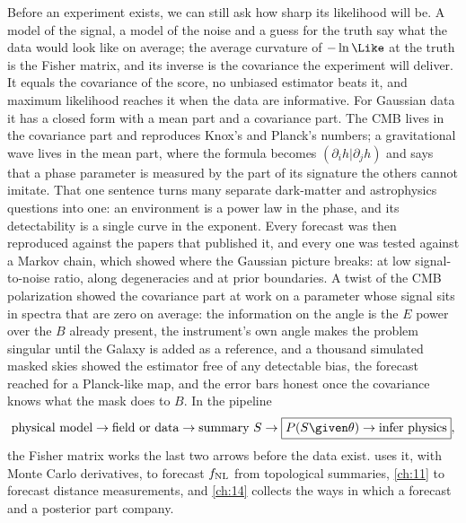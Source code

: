 Before an experiment exists, we can still ask how sharp its likelihood will be. A model of the signal, a model of the
noise and a guess for the truth say what the data would look like on average; the average curvature of $-\ln\Like$ at
the truth is the Fisher matrix, and its inverse is the covariance the experiment will deliver. It equals the
covariance of the score, no unbiased estimator beats it, and maximum likelihood reaches it when the data are
informative. For Gaussian data it has a closed form with a mean part and a covariance part. The CMB lives in the
covariance part and reproduces Knox's and Planck's numbers; a gravitational wave lives in the mean part, where the
formula becomes $(\partial_ih|\partial_jh)$ and says that a phase parameter is measured by the part of its signature
the others cannot imitate. That one sentence turns many separate dark-matter and astrophysics questions into one: an
environment is a power law in the phase, and its detectability is a single curve in the exponent. Every forecast was
then reproduced against the papers that published it, and every one was tested against a Markov chain, which showed
where the Gaussian picture breaks: at low signal-to-noise ratio, along degeneracies and at prior boundaries. A twist
of the CMB polarization showed the covariance part at work on a parameter whose signal sits in spectra that are zero
on average: the information on the angle is the $E$ power over the $B$ already present, the instrument's own angle
makes the problem singular until the Galaxy is added as a reference, and a thousand simulated masked skies showed the
estimator free of any detectable bias, the forecast reached for a Planck-like map, and the error bars honest once the covariance knows what the mask does to $B$. In the
pipeline
\[
  \text{physical model}\to\text{field or data}\to\text{summary }S\to\boxed{P(S\given\theta)\to\text{infer physics}},
\]
the Fisher matrix works the last two arrows before the data exist.  uses it, with Monte Carlo derivatives, to
forecast $f_{\rm NL}$ from topological summaries, \cref{ch:11} to forecast distance measurements, and \cref{ch:14}
collects the ways in which a forecast and a posterior part company.

